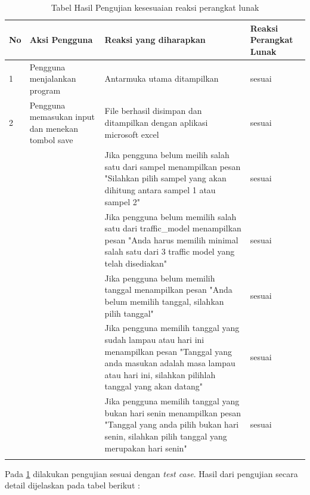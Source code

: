 \begin{longtable}{|p{0.5cm}|p{4cm}|p{4cm}|p{4cm}|}
\centering
No & Aksi Pengguna & Reaksi yang diharapkan & Reaksi Perangkat Lunak \\ \hline
1 & Pengguna menjalankan program & Antarmuka utama ditampilkan & sesuai \\ \hline
2 & Pengguna memasukan input dan menekan tombol save & File berhasil disimpan dan ditampilkan dengan aplikasi microsoft excel & sesuai \\ \hline
 &  & Jika pengguna belum meilih salah satu dari sampel menampilkan pesan "Silahkan pilih sampel yang akan dihitung antara sampel 1 atau sampel 2" & sesuai \\ \hline
 &  & Jika pengguna belum memilih salah satu dari traffic\_model menampilkan pesan "Anda harus memilih minimal salah satu dari 3 traffic model yang telah disediakan" & sesuai \\ \hline
 &  & Jika pengguna belum memilih tanggal menampilkan pesan "Anda belum memilih tanggal, silahkan pilih tanggal" & sesuai \\ \hline
 &  & Jika pengguna memilih tanggal yang sudah lampau atau hari ini menampilkan pesan "Tanggal yang anda masukan adalah masa lampau atau hari ini, silahkan pilihlah tanggal yang akan datang" & sesuai \\ \hline
 &  & Jika pengguna memilih tanggal yang bukan hari senin menampilkan pesan "Tanggal yang anda pilih bukan hari senin, silahkan pilih tanggal yang merupakan hari senin" & sesuai \\ \hline
\caption{Tabel Hasil Pengujian kesesuaian reaksi perangkat lunak}
\label{tab:pengujian1}
\end{longtable}

Pada \ref{tab:pengujian1} dilakukan pengujian sesuai dengan \textit{test case}. Hasil dari pengujian secara detail dijelaskan pada tabel berikut :

